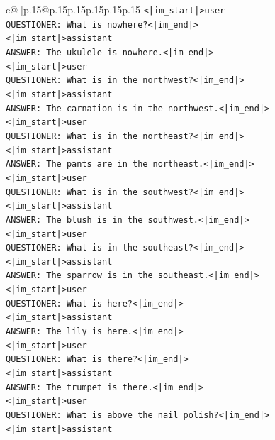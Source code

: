 \documentclass{article}
\begin{document}
{\begin{supertabular}{c@{$\;$}|p{.15\linewidth}@{}p{.15\linewidth}p{.15\linewidth}p{.15\linewidth}p{.15\linewidth}p{.15\linewidth}}
{{{\texttt{<|im\_start|>user} \\
\texttt{QUESTIONER: What is nowhere?<|im\_end|>} \\
\texttt{<|im\_start|>assistant} \\
\texttt{ANSWER: The ukulele is nowhere.<|im\_end|>} \\
\texttt{<|im\_start|>user} \\
\texttt{QUESTIONER: What is in the northwest?<|im\_end|>} \\
\texttt{<|im\_start|>assistant} \\
\texttt{ANSWER: The carnation is in the northwest.<|im\_end|>} \\
\texttt{<|im\_start|>user} \\
\texttt{QUESTIONER: What is in the northeast?<|im\_end|>} \\
\texttt{<|im\_start|>assistant} \\
\texttt{ANSWER: The pants are in the northeast.<|im\_end|>} \\
\texttt{<|im\_start|>user} \\
\texttt{QUESTIONER: What is in the southwest?<|im\_end|>} \\
\texttt{<|im\_start|>assistant} \\
\texttt{ANSWER: The blush is in the southwest.<|im\_end|>} \\
\texttt{<|im\_start|>user} \\
\texttt{QUESTIONER: What is in the southeast?<|im\_end|>} \\
\texttt{<|im\_start|>assistant} \\
\texttt{ANSWER: The sparrow is in the southeast.<|im\_end|>} \\
\texttt{<|im\_start|>user} \\
\texttt{QUESTIONER: What is here?<|im\_end|>} \\
\texttt{<|im\_start|>assistant} \\
\texttt{ANSWER: The lily is here.<|im\_end|>} \\
\texttt{<|im\_start|>user} \\
\texttt{QUESTIONER: What is there?<|im\_end|>} \\
\texttt{<|im\_start|>assistant} \\
\texttt{ANSWER: The trumpet is there.<|im\_end|>} \\
\texttt{<|im\_start|>user} \\
\texttt{QUESTIONER: What is above the nail polish?<|im\_end|>} \\
\texttt{<|im\_start|>assistant} \\
}}}
\end{supertabular}}
\end{document}

